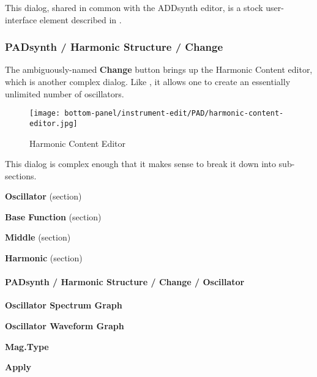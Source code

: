    This dialog, shared in common with the ADDsynth editor, is a stock
   user-interface element described in
   .

\subsubsection{PADsynth / Harmonic Structure / Change}
\label{subsubsec:padsynth_harmonic_structure_change}

   The ambiguously-named \textbf{Change} button brings up the
   Harmonic Content editor, which is another complex dialog.
   Like ,
   it allows one to create an essentially unlimited number of oscillators. 

\begin{figure}[H]
   \centering 
   \texttt{[image: bottom-panel/instrument-edit/PAD/harmonic-content-editor.jpg]}
   \caption{Harmonic Content Editor}
   \label{fig:padsynth_harmonic_content_editor}
\end{figure}

   This dialog is complex enough that it makes sense to break it down into
   sub-sections.

   \begin{enumber}
      \item \textbf{Oscillator} (section)
      \item \textbf{Base Function} (section)
      \item \textbf{Middle} (section)
      \item \textbf{Harmonic} (section)
   \end{enumber}

\paragraph{PADsynth / Harmonic Structure / Change / Oscillator}
\label{paragraph:padsynth_harmonic_structure_change_oscillator}

   \begin{enumber}
      \item \textbf{Oscillator Spectrum Graph}
      \item \textbf{Oscillator Waveform Graph}
      \item \textbf{Mag.Type}
      \item \textbf{Apply}
   \end{enumber}

   \setcounter{ItemCounter}{0}      %

